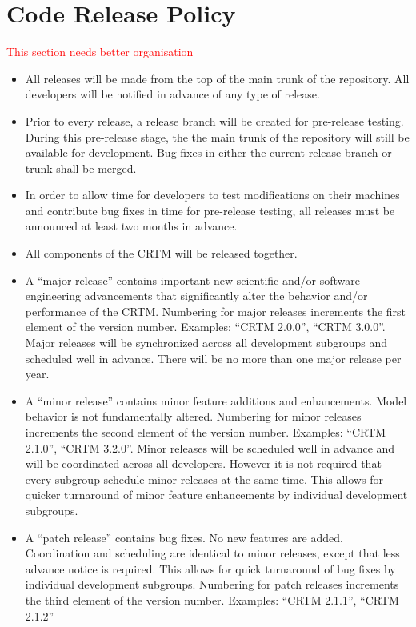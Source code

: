 \section{Code Release Policy}
\textcolor{red}{This section needs better organisation}
\begin{itemize}
  \item All releases will be made from the top of the main trunk of the repository. All developers will be notified in advance of any type of release.  

  \item Prior to every release, a release branch will be created for pre-release testing. During this pre-release stage, the the main trunk of the repository will still be available for development. Bug-fixes in either the current release branch or trunk shall be merged.

  \item In order to allow time for developers to test modifications on their machines and contribute bug fixes in time for pre-release testing, all releases must be announced at least two months in advance.

  \item All components of the CRTM will be released together.  

  \item A ``major release'' contains important new scientific and/or software engineering advancements that significantly alter the behavior and/or performance of the CRTM. Numbering for major releases increments the first element of the version number.  Examples:  ``CRTM 2.0.0'', ``CRTM 3.0.0''. Major releases will be synchronized across all development subgroups and scheduled well in advance. There will be no more than one major release per year.  

  \item A ``minor release'' contains minor feature additions and enhancements. Model behavior is not fundamentally altered.  Numbering for minor releases increments the second element of the version number.  Examples:  ``CRTM 2.1.0'', ``CRTM 3.2.0''. Minor releases will be scheduled well in advance and will be coordinated across all developers.  However it is not required that every subgroup schedule minor releases at the same time.  This allows for quicker turnaround of minor feature enhancements by individual development subgroups.  

  \item A ``patch release'' contains bug fixes.  No new features are added. Coordination and scheduling are identical to minor releases, except that less advance notice is required. This allows for quick turnaround of bug fixes by individual development subgroups. Numbering for patch releases increments the third element of the version number.  Examples:  ``CRTM 2.1.1'', ``CRTM 2.1.2''


\end{itemize}
